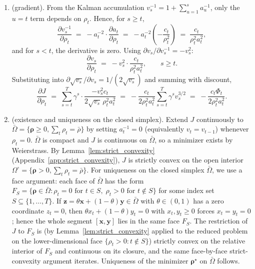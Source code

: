 \documentclass{article}
\begin{document}
\begin{enumerate}
    \item[Step 1] (gradient). From the Kalman accumulation $v_s^{-1} = 1 + \sum_{u=1}^s a_u^{-1}$, only the $u = t$ term depends on $\rho_t$. Hence, for $s \ge t$,
    $$\frac{\partial v_s^{-1}}{\partial \rho_t} \;=\; -a_t^{-2}\cdot\frac{\partial a_t}{\partial \rho_t} \;=\; -a_t^{-2}\!\left(-\frac{c_t}{\rho_t^2}\right) \;=\; \frac{c_t}{\rho_t^2 a_t^2},$$
    and for $s < t$, the derivative is zero. Using $\partial v_s/\partial v_s^{-1} = -v_s^2$:
    $$\frac{\partial v_s}{\partial \rho_t} \;=\; -v_s^2 \cdot \frac{c_t}{\rho_t^2 a_t^2}, \qquad s \ge t.$$
    Substituting into $\partial \sqrt{v_s}/\partial v_s = 1/(2\sqrt{v_s})$ and summing with discount,
    $$\frac{\partial J}{\partial \rho_t} \;=\; \sum_{s=t}^T \gamma^s \cdot \frac{-v_s^2 c_t}{2\sqrt{v_s}\,\rho_t^2 a_t^2} \;=\; -\frac{c_t}{2\rho_t^2 a_t^2}\sum_{s=t}^T \gamma^s v_s^{3/2} \;=\; -\frac{c_t \Phi_t}{2\rho_t^2 a_t^2}.$$
    
    \item[Step 2] (existence and uniqueness on the closed simplex). Extend $J$ continuously to $\bar\Omega = \{\boldsymbol\rho \ge 0, \sum_t \rho_t = \bar\rho\}$ by setting $a_t^{-1} = 0$ (equivalently $v_t = v_{t-1}$) whenever $\rho_t = 0$. $\bar\Omega$ is compact and $J$ is continuous on $\bar\Omega$, so a minimizer exists by Weierstrass. By Lemma~\ref{lem:strict_convexity} (Appendix~\ref{app:strict_convexity}), $J$ is strictly convex on the open interior $\Omega^\circ = \{\boldsymbol\rho > 0, \sum_t \rho_t = \bar\rho\}$. For uniqueness on the closed simplex $\bar\Omega$, we use a face argument: each face of $\bar\Omega$ has the form $F_S = \{\boldsymbol\rho \in \bar\Omega : \rho_t = 0\text{ for }t \in S,\; \rho_t > 0\text{ for }t \notin S\}$ for some index set $S \subseteq \{1,\ldots,T\}$. If $\mathbf z = \theta \mathbf x + (1-\theta)\mathbf y \in \bar\Omega$ with $\theta \in (0,1)$ has a zero coordinate $z_t = 0$, then $\theta x_t + (1-\theta) y_t = 0$ with $x_t, y_t \ge 0$ forces $x_t = y_t = 0$; hence the whole segment $[\mathbf x, \mathbf y]$ lies in the same face $F_S$. The restriction of $J$ to $F_S$ is (by Lemma~\ref{lem:strict_convexity} applied to the reduced problem on the lower-dimensional face $\{\rho_t > 0 : t \notin S\}$) strictly convex on the relative interior of $F_S$ and continuous on its closure, and the same face-by-face strict-convexity argument iterates. Uniqueness of the minimizer $\boldsymbol{\rho}^\star$ on $\bar\Omega$ follows.
    

\end{enumerate}
\end{document}
